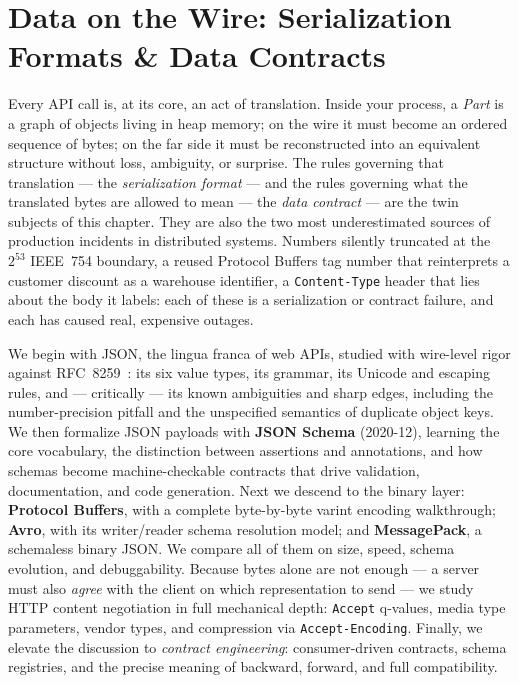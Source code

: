 \chapter{Data on the Wire: Serialization Formats \& Data Contracts}
\label{ch:serialization}

Every API call is, at its core, an act of translation. Inside your process, a
\emph{Part} is a graph of objects living in heap memory; on the wire it must become
an ordered sequence of bytes; on the far side it must be reconstructed into an
equivalent structure without loss, ambiguity, or surprise. The rules governing that
translation --- the \emph{serialization format} --- and the rules governing what the
translated bytes are allowed to mean --- the \emph{data contract} --- are the twin
subjects of this chapter. They are also the two most underestimated sources of
production incidents in distributed systems. Numbers silently truncated at the
$2^{53}$ IEEE~754 boundary, a reused Protocol Buffers tag number that reinterprets
a customer discount as a warehouse identifier, a \texttt{Content-Type} header that
lies about the body it labels: each of these is a serialization or contract failure,
and each has caused real, expensive outages.

We begin with JSON, the lingua franca of web APIs, studied with wire-level rigor
against RFC~8259~\cite{rfc8259}: its six value types, its grammar, its Unicode and
escaping rules, and --- critically --- its known ambiguities and sharp edges, including
the number-precision pitfall and the unspecified semantics of duplicate object keys.
We then formalize JSON payloads with \textbf{JSON Schema} (2020-12), learning the core
vocabulary, the distinction between assertions and annotations, and how schemas become
machine-checkable contracts that drive validation, documentation, and code generation.
Next we descend to the binary layer: \textbf{Protocol Buffers}, with a complete
byte-by-byte varint encoding walkthrough; \textbf{Avro}, with its writer/reader schema
resolution model; and \textbf{MessagePack}, a schemaless binary JSON. We compare all of
them on size, speed, schema evolution, and debuggability. Because bytes alone are not
enough --- a server must also \emph{agree} with the client on which representation to
send --- we study HTTP content negotiation in full mechanical depth: \texttt{Accept}
q-values, media type parameters, vendor types, and compression via
\texttt{Accept-Encoding}. Finally, we elevate the discussion to \emph{contract
engineering}: consumer-driven contracts, schema registries, and the precise meaning of
backward, forward, and full compatibility.

